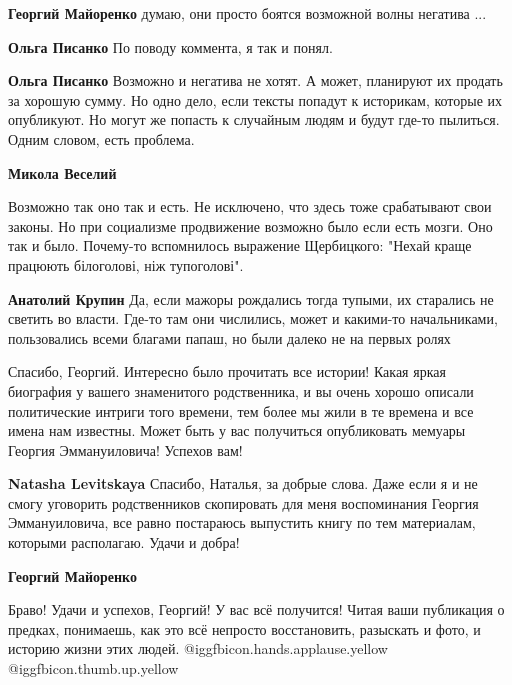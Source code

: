 \begin{itemize}
\begin{itemize}
\begin{itemize}
\textbf{Георгий Майоренко} думаю, они просто боятся возможной волны негатива ...

\textbf{Ольга Писанко} По поводу коммента, я так и понял.

\textbf{Ольга Писанко} Возможно и негатива не хотят. А может, планируют их продать за хорошую сумму. Но одно дело, если тексты попадут к историкам, которые их опубликуют. Но могут же попасть к случайным людям и будут где-то пылиться. Одним словом, есть проблема.
\end{itemize} %

\textbf{Микола Веселий} 

Возможно так оно так и есть. Не исключено, что здесь тоже срабатывают свои
законы. Но при социализме продвижение возможно было если есть мозги. Оно так и
было. Почему-то вспомнилось выражение Щербицкого: "Нехай краще працюють
білоголові, ніж тупоголові".

\begin{itemize} %
\textbf{Анатолий Крупин} Да, если мажоры рождались тогда тупыми, их старались не светить во власти. Где-то там они числились, может и какими-то начальниками, пользовались всеми благами папаш, но были далеко не на первых ролях
\end{itemize} %

\end{itemize} %


Спасибо, Георгий. Интересно было прочитать все истории! Какая яркая биография у
вашего знаменитого родственника, и вы очень хорошо описали политические интриги
того времени, тем более мы жили в те времена и все имена нам известны. Может
быть у вас получиться опубликовать мемуары Георгия Эммануиловича! Успехов вам!

\begin{itemize} %
\textbf{Natasha Levitskaya} Спасибо, Наталья, за добрые слова. Даже если я и не смогу уговорить родственников скопировать для меня воспоминания Георгия Эммануиловича, все равно постараюсь выпустить книгу по тем материалам, которыми располагаю. Удачи и добра!

\textbf{Георгий Майоренко}

Браво! Удачи и успехов, Георгий!
У вас всё получится! Читая ваши публикация о предках, понимаешь, как это всё непросто восстановить, разыскать и фото, и историю жизни этих людей. @igg{fbicon.hands.applause.yellow}  @igg{fbicon.thumb.up.yellow} 
\end{itemize} %


\end{itemize}

